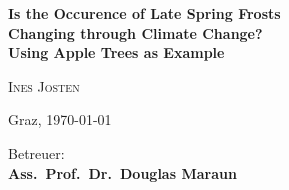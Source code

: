 \begin{titlepage}
\begin{center}
  \vspace*{1.8cm}

  {\huge{\textbf{\textsf{Is the Occurence of Late Spring Frosts \\[0.15cm] Changing through Climate Change? \\[0.6cm] Using Apple Trees as Example}}}} %

  \vspace{1.5cm}


  {\large{\textsc{Ines Josten}}}

  \vspace{1.2cm}

  {\large{Graz, \today}}


  \vspace{1.5cm}
  {\large{Betreuer:}} \\
  
  {\large{\textbf{Ass.\ Prof.\ Dr.\ Douglas Maraun \\ 
  }}}

 





  \vfill

\end{center}

\end{titlepage}
\cleardoublepage
